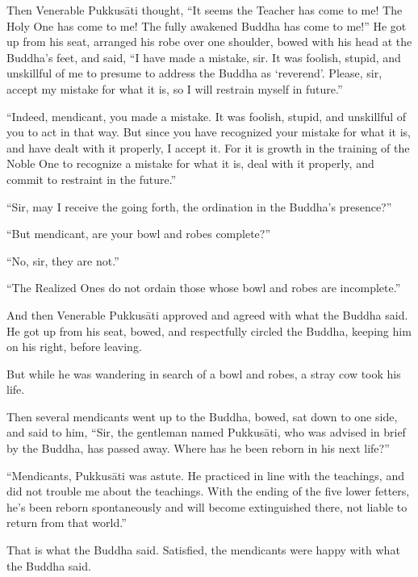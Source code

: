 \documentclass[12pt,openany]{book}%
\begin{document}
Then Venerable \textsanskrit{Pukkusāti} thought, “It seems the Teacher has come to me! The Holy One has come to me! The fully awakened Buddha has come to me!” He got up from his seat, arranged his robe over one shoulder, bowed with his head at the Buddha’s feet, and said, “I have made a mistake, sir. It was foolish, stupid, and unskillful of me to presume to address the Buddha as ‘reverend’. Please, sir, accept my mistake for what it is, so I will restrain myself in future.” 

“Indeed, mendicant, you made a mistake. It was foolish, stupid, and unskillful of you to act in that way. But since you have recognized your mistake for what it is, and have dealt with it properly, I accept it. For it is growth in the training of the Noble One to recognize a mistake for what it is, deal with it properly, and commit to restraint in the future.” 

“Sir, may I receive the going forth, the ordination in the Buddha’s presence?” 

“But mendicant, are your bowl and robes complete?” 

“No, sir, they are not.” 

“The Realized Ones do not ordain those whose bowl and robes are incomplete.” 

And then Venerable \textsanskrit{Pukkusāti} approved and agreed with what the Buddha said. He got up from his seat, bowed, and respectfully circled the Buddha, keeping him on his right, before leaving. 

But while he was wandering in search of a bowl and robes, a stray cow took his life. 

Then several mendicants went up to the Buddha, bowed, sat down to one side, and said to him, “Sir, the gentleman named \textsanskrit{Pukkusāti}, who was advised in brief by the Buddha, has passed away. Where has he been reborn in his next life?” 

“Mendicants, \textsanskrit{Pukkusāti} was astute. He practiced in line with the teachings, and did not trouble me about the teachings. With the ending of the five lower fetters, he’s been reborn spontaneously and will become extinguished there, not liable to return from that world.” 

That is what the Buddha said. Satisfied, the mendicants were happy with what the Buddha said. 
\end{document}
